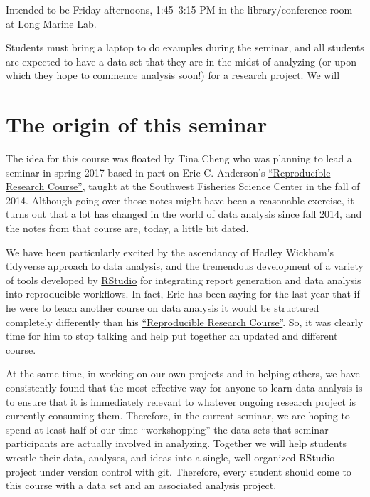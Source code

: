 \documentclass[]{book}
\theoremstyle{definition}
\theoremstyle{definition}
\theoremstyle{remark}
\begin{document}
Intended to be Friday afternoons, 1:45--3:15 PM in the
library/conference room at Long Marine Lab.

Students must bring a laptop to do examples during the seminar, and all
students are expected to have a data set that they are in the midst of
analyzing (or upon which they hope to commence analysis soon!) for a
research project. We will

\section{The origin of this seminar}\label{the-origin-of-this-seminar}

The idea for this course was floated by Tina Cheng who was planning to
lead a seminar in spring 2017 based in part on Eric C. Anderson's
\href{http://eriqande.github.io/rep-res-web/}{``Reproducible Research
Course''}, taught at the Southwest Fisheries Science Center in the fall
of 2014. Although going over those notes might have been a reasonable
exercise, it turns out that a lot has changed in the world of data
analysis since fall 2014, and the notes from that course are, today, a
little bit dated.

We have been particularly excited by the ascendancy of Hadley Wickham's
\href{http://tidyverse.org/}{tidyverse} approach to data analysis, and
the tremendous development of a variety of tools developed by
\href{https://www.rstudio.com/}{RStudio} for integrating report
generation and data analysis into reproducible workflows. In fact, Eric
has been saying for the last year that if he were to teach another
course on data analysis it would be structured completely differently
than his \href{http://eriqande.github.io/rep-res-web/}{``Reproducible
Research Course''}. So, it was clearly time for him to stop talking and
help put together an updated and different course.

At the same time, in working on our own projects and in helping others,
we have consistently found that the most effective way for anyone to
learn data analysis is to ensure that it is immediately relevant to
whatever ongoing research project is currently consuming them.
Therefore, in the current seminar, we are hoping to spend at least half
of our time ``workshopping'' the data sets that seminar participants are
actually involved in analyzing. Together we will help students wrestle
their data, analyses, and ideas into a single, well-organized RStudio
project under version control with git. Therefore, every student should
come to this course with a data set and an associated analysis project.
\end{document}
